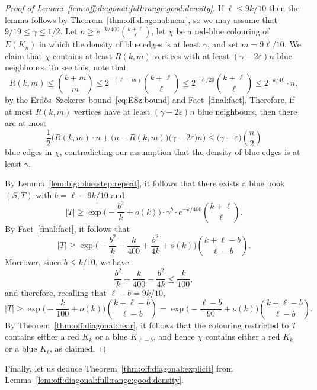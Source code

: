 \documentclass[12pt,reqno]{amsart}
\theoremstyle{definition}
\theoremstyle{remark}
\newcommand\eps{\varepsilon}
\renewcommand{\le}{\leqslant}
\renewcommand{\ge}{\geqslant}
\def\eps{\varepsilon}
\begin{document}
\begin{proof}[Proof of Lemma~\ref{lem:off:diagonal:full:range:good:density}]
If $\ell \le 9k/10$ then the lemma follows by Theorem~\ref{thm:off:diagonal:near}, so we may assume that $9/19 \le \gamma \le 1/2$. Let $n \ge e^{-k/400} {k + \ell \choose \ell}$, let $\chi$ be a red-blue colouring of $E(K_n)$ in which the density of blue edges is at least $\gamma$, and set $m = 9\ell/10$. We claim that $\chi$ contains at least $R(k,m)$ vertices with at least $(\gamma - 2\eps) n$ blue neighbours. To see this, note that 
$$R(k,m) \le {k + m \choose m} \le 2^{-(\ell - m)} {k + \ell \choose \ell} \le 2^{-\ell/20} {k + \ell \choose \ell} \le 2^{-k/40} \cdot n,$$
by the Erd\H{o}s--Szekeres bound~\eqref{eq:ESz:bound} and Fact~\ref{final:fact}. %
Therefore, if at most $R(k,m)$ vertices have at least $(\gamma - 2\eps) n$ blue neighbours, then there are at most
$$\frac{1}{2} \Big( R(k,m) \cdot n + \big( n - R(k,m) \big) \big( \gamma - 2\eps \big) n \Big) \le \big( \gamma - \eps \big) {n \choose 2}$$
blue edges in $\chi$, contradicting our assumption that the density of blue edges is at least $\gamma$. 

By Lemma~\ref{lem:big:blue:step:repeat}, it follows that there exists a blue book $(S,T)$ with $b = \ell - 9k/10$ and 
$$|T| \ge \exp\bigg( - \frac{b^2}{k} + o(k) \bigg) \cdot \gamma^b \cdot e^{-k/400} {k + \ell \choose \ell}.$$  
By Fact~\ref{final:fact}, it follows that
$$|T| \ge \exp\bigg( - \frac{b^2}{k} - \frac{k}{400} + \frac{b^2}{4k} + o(k) \bigg) {k + \ell - b \choose \ell - b}.$$ 
Moreover, since $b \le k/10$, %
we have
$$\frac{b^2}{k} + \frac{k}{400} - \frac{b^2}{4k} \le \frac{k}{100},$$
and therefore, recalling that $\ell - b = 9k/10$,
$$|T| \ge \exp\bigg( - \frac{k}{100} + o(k) \bigg) {k + \ell - b \choose \ell - b}  = \exp\bigg( - \frac{\ell - b}{90} + o(k) \bigg) {k + \ell - b \choose \ell - b}.$$ 
By Theorem~\ref{thm:off:diagonal:near}, it follows that the colouring restricted to $T$ contains either a red $K_k$ or a blue $K_{\ell - b}$, and hence $\chi$ contains either a red $K_k$ or a blue $K_\ell$, as claimed.
 \end{proof}


Finally, let us deduce Theorem~\ref{thm:off:diagonal:explicit} from Lemma~\ref{lem:off:diagonal:full:range:good:density}.
\end{document}
